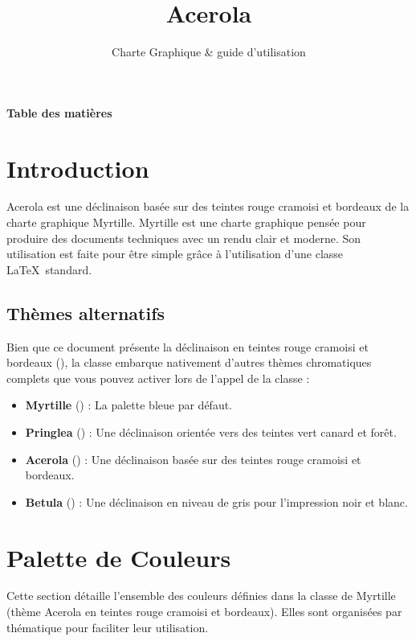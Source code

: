 \documentclass[theme=acerola]{myrtille}
\title{Acerola}
\subtitle{Charte Graphique \& guide d'utilisation}
\begin{document}
\makecover

{\sffamily\Large\bfseries\color{dark} Table des matières}\par
\vspace{-15pt} %
\hrulefull
\tableofcontents

\newpage


\section{Introduction}
Acerola est une déclinaison basée sur des teintes rouge cramoisi et bordeaux de la charte graphique Myrtille. Myrtille est une charte graphique pensée pour produire des documents techniques avec un rendu clair et moderne. Son utilisation est faite pour être simple grâce à l'utilisation d'une classe \LaTeX\ standard.

\subsection{Thèmes alternatifs}
Bien que ce document présente la déclinaison en teintes rouge cramoisi et bordeaux (), la classe embarque nativement d'autres thèmes chromatiques complets que vous pouvez activer lors de l'appel de la classe :
\begin{itemize}
    \item \textbf{Myrtille} () : La palette bleue par défaut.
    \item \textbf{Pringlea} () : Une déclinaison orientée vers des teintes vert canard et forêt.
    \item \textbf{Acerola} () : Une déclinaison basée sur des teintes rouge cramoisi et bordeaux.
    \item \textbf{Betula} () : Une déclinaison en niveau de gris pour l'impression noir et blanc.
\end{itemize}

\section{Palette de Couleurs}
Cette section détaille l'ensemble des couleurs définies dans la classe de Myrtille (thème Acerola en teintes rouge cramoisi et bordeaux). Elles sont organisées par thématique pour faciliter leur utilisation.
\end{document}
